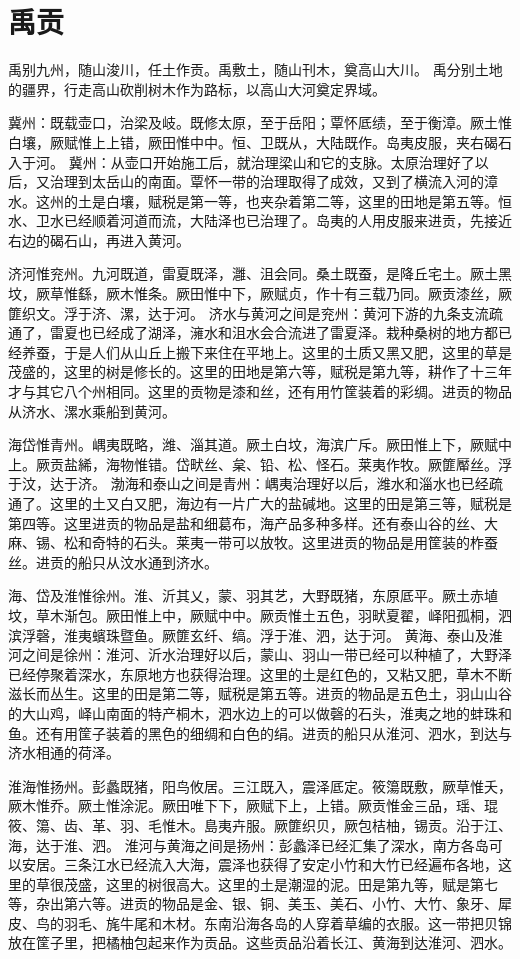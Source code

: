 \documentclass[a4paper,12pt,UTF8,twoside]{ctexbook}
\begin{document}
\chapter{禹贡}

禹别九州，随山浚川，任土作贡。禹敷土，随山刊木，奠高山大川。
禹分别土地的疆界，行走高山砍削树木作为路标，以高山大河奠定界域。

冀州：既载壶口，治梁及岐。既修太原，至于岳阳；覃怀厎绩，至于衡漳。厥土惟白壤，厥赋惟上上错，厥田惟中中。恒、卫既从，大陆既作。岛夷皮服，夹右碣石入于河。
冀州：从壶口开始施工后，就治理梁山和它的支脉。太原治理好了以后，又治理到太岳山的南面。覃怀一带的治理取得了成效，又到了横流入河的漳水。这州的土是白壤，赋税是第一等，也夹杂着第二等，这里的田地是第五等。恒水、卫水已经顺着河道而流，大陆泽也已治理了。岛夷的人用皮服来进贡，先接近右边的碣石山，再进入黄河。

济河惟兖州。九河既道，雷夏既泽，灉、沮会同。桑土既蚕，是降丘宅土。厥土黑坟，厥草惟繇，厥木惟条。厥田惟中下，厥赋贞，作十有三载乃同。厥贡漆丝，厥篚织文。浮于济、漯，达于河。
济水与黄河之间是兖州：黄河下游的九条支流疏通了，雷夏也已经成了湖泽，澭水和沮水会合流进了雷夏泽。栽种桑树的地方都已经养蚕，于是人们从山丘上搬下来住在平地上。这里的土质又黑又肥，这里的草是茂盛的，这里的树是修长的。这里的田地是第六等，赋税是第九等，耕作了十三年才与其它八个州相同。这里的贡物是漆和丝，还有用竹筐装着的彩绸。进贡的物品从济水、漯水乘船到黄河。

海岱惟青州。嵎夷既略，潍、淄其道。厥土白坟，海滨广斥。厥田惟上下，厥赋中上。厥贡盐絺，海物惟错。岱畎丝、枲、铅、松、怪石。莱夷作牧。厥篚厴丝。浮于汶，达于济。
渤海和泰山之间是青州：嵎夷治理好以后，潍水和淄水也已经疏通了。这里的土又白又肥，海边有一片广大的盐碱地。这里的田是第三等，赋税是第四等。这里进贡的物品是盐和细葛布，海产品多种多样。还有泰山谷的丝、大麻、锡、松和奇特的石头。莱夷一带可以放牧。这里进贡的物品是用筐装的柞蚕丝。进贡的船只从汶水通到济水。

海、岱及淮惟徐州。淮、沂其乂，蒙、羽其艺，大野既猪，东原厎平。厥土赤埴坟，草木渐包。厥田惟上中，厥赋中中。厥贡惟土五色，羽畎夏翟，峄阳孤桐，泗滨浮磬，淮夷蠙珠暨鱼。厥篚玄纤、缟。浮于淮、泗，达于河。
黄海、泰山及淮河之间是徐州：淮河、沂水治理好以后，蒙山、羽山一带已经可以种植了，大野泽已经停聚着深水，东原地方也获得治理。这里的土是红色的，又粘又肥，草木不断滋长而丛生。这里的田是第二等，赋税是第五等。进贡的物品是五色土，羽山山谷的大山鸡，峄山南面的特产桐木，泗水边上的可以做磬的石头，淮夷之地的蚌珠和鱼。还有用筐子装着的黑色的细绸和白色的绢。进贡的船只从淮河、泗水，到达与济水相通的荷泽。

淮海惟扬州。彭蠡既猪，阳鸟攸居。三江既入，震泽厎定。筱簜既敷，厥草惟夭，厥木惟乔。厥土惟涂泥。厥田唯下下，厥赋下上，上错。厥贡惟金三品，瑶、琨筱、簜、齿、革、羽、毛惟木。島夷卉服。厥篚织贝，厥包桔柚，锡贡。沿于江、海，达于淮、泗。
淮河与黄海之间是扬州：彭蠡泽已经汇集了深水，南方各岛可以安居。三条江水已经流入大海，震泽也获得了安定小竹和大竹已经遍布各地，这里的草很茂盛，这里的树很高大。这里的土是潮湿的泥。田是第九等，赋是第七等，杂出第六等。进贡的物品是金、银、铜、美玉、美石、小竹、大竹、象牙、犀皮、鸟的羽毛、旄牛尾和木材。东南沿海各岛的人穿着草编的衣服。这一带把贝锦放在筐子里，把橘柚包起来作为贡品。这些贡品沿着长江、黄海到达淮河、泗水。
\end{document}
